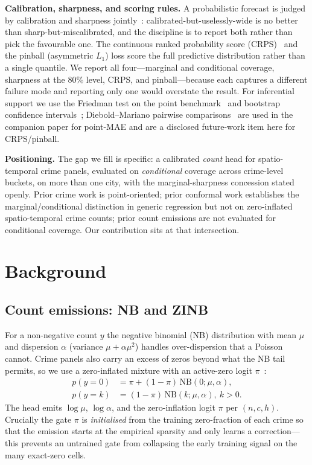 \documentclass[11pt,conference]{IEEEtran}
\begin{document}
\textbf{Calibration, sharpness, and scoring rules.} A probabilistic forecast is
judged by calibration and sharpness jointly~\cite{gneiting2007calibration}:
calibrated-but-uselessly-wide is no better than sharp-but-miscalibrated, and the
discipline is to report both rather than pick the favourable one. The continuous
ranked probability score (CRPS)~\cite{gneiting2007strictly} and the pinball
(asymmetric $L_1$) loss score the full predictive distribution rather than a
single quantile. We report all four---marginal and conditional coverage,
sharpness at the 80\% level, CRPS, and pinball---because each captures a
different failure mode and reporting only one would overstate the result. For
inferential support we use the Friedman test on the point
benchmark~\cite{friedman1937use} and bootstrap confidence
intervals~\cite{efron1993bootstrap}; Diebold--Mariano pairwise
comparisons~\cite{diebold1995comparing} are used in the companion paper for
point-MAE and are a disclosed future-work item here for CRPS/pinball.

\textbf{Positioning.} The gap we fill is specific: a calibrated \emph{count}
head for spatio-temporal crime panels, evaluated on \emph{conditional} coverage
across crime-level buckets, on more than one city, with the marginal-sharpness
concession stated openly. Prior crime work is point-oriented; prior conformal
work establishes the marginal/conditional distinction in generic regression but
not on zero-inflated spatio-temporal crime counts; prior count emissions are
not evaluated for conditional coverage. Our contribution sits at that
intersection.

\section{Background}\label{sec:background}
\subsection{Count emissions: NB and ZINB}\label{sec:zinb}
For a non-negative count $y$ the negative binomial (NB) distribution with mean
$\mu$ and dispersion $\alpha$ (variance $\mu+\alpha\mu^2$) handles
over-dispersion that a Poisson cannot. Crime panels also carry an excess of zeros
beyond what the NB tail permits, so we use a zero-inflated mixture with an
active-zero logit $\pi$~\cite{lambert1992poisson,hilbe2011negativebinomial}:
\begin{equation}\label{eq:zinb}
\begin{split}
  p(y{=}0)&=\pi+(1{-}\pi)\,\mathrm{NB}(0;\mu,\alpha),\\
  p(y{=}k)&=(1{-}\pi)\,\mathrm{NB}(k;\mu,\alpha),\ k>0.
\end{split}
\end{equation}
The head emits $\log\mu$, $\log\alpha$, and the zero-inflation logit $\pi$ per
$(n,c,h)$. Crucially the gate $\pi$ is \emph{initialised} from the training
zero-fraction of each crime so that the emission starts at the empirical sparsity
and only learns a correction---this prevents an untrained gate from collapsing
the early training signal on the many exact-zero cells.
\end{document}
